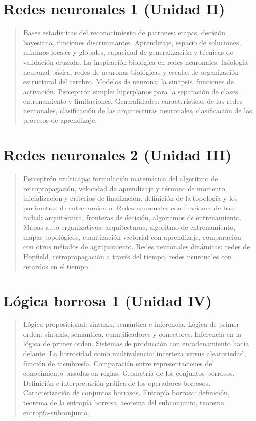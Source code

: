 \documentclass[10pt,a4paper]{article}
\begin{document}
\section*{Redes neuronales 1 (Unidad II)}
\begin{quote}
Bases estadísticas del reconocimiento de patrones: etapas, decisión bayesiana, funciones discriminantes. Aprendizaje, espacio de soluciones, mínimos locales y globales, capacidad de generalización y técnicas de validación cruzada. La inspiración biológica en redes neuronales: fisiología neuronal básica, redes de neuronas biológicas y escalas de organización estructural del cerebro. Modelos de neurona: la sinapsis, funciones de activación. Perceptrón simple: hiperplanos para la separación de clases, entrenamiento y limitaciones. Generalidades: características de las redes neuronales, clasificación de las arquitecturas neuronales, clasificación de los procesos de aprendizaje.
\end{quote}

\section*{Redes neuronales 2 (Unidad III)}
\begin{quote}
Perceptrón multicapa: formulación matemática del algoritmo de retropropagación, velocidad de aprendizaje y término de momento, inicialización y criterios de finalización, definición de la topología y los parámetros de entrenamiento. Redes neuronales con funciones de base radial: arquitectura, fronteras de decisión, algoritmos de entrenamiento. Mapas auto-organizativos: arquitecturas, algoritmo de entrenamiento, mapas topológicos, cuantización vectorial con aprendizaje, comparación con otros métodos de agrupamiento. Redes neuronales dinámicas: redes de Hopfield, retropropagación a través del tiempo, redes neuronales con retardos en el tiempo.
\end{quote}

\section*{Lógica borrosa 1 (Unidad IV)}
\begin{quote}
Lógica proposicional: sintaxis, semántica e inferencia. Lógica de primer orden: sintaxis, semántica, cuantificadores y conectores. Inferencia en la lógica de primer orden. Sistemas de producción con encadenamiento hacia delante. La borrosidad como multivalencia: incerteza versus aleatoriedad,  función de membresía. Comparación entre representaciones del conocimiento basadas en reglas. Geometría de los conjuntos borrosos. Definición e interpretación gráfica de los operadores borrosos. Caracterización de conjuntos borrosos. Entropía borrosa: definición, teorema de la entropía borrosa, teorema del subconjunto, teorema entropía-subconjunto.
\end{quote}
\end{document}
